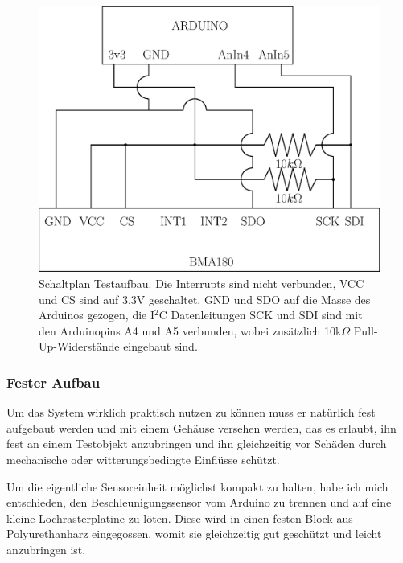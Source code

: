 \documentclass[12pt,a4paper]{scrartcl}
\begin{document}
\begin{figure}[h]
\centering
\includegraphics[scale=.8]{schematics.eps}
\caption{Schaltplan Testaufbau. Die Interrupts sind nicht verbunden, VCC und CS sind auf 3.3V geschaltet, GND und SDO auf die Masse des Arduinos gezogen, die I$^2$C Datenleitungen SCK und SDI sind mit den Arduinopins A4 und A5 verbunden, wobei zusätzlich 10k$\Omega$ Pull-Up-Widerstände eingebaut sind.}
\label{schematics}
\end{figure}


\newpage
\subsubsection{Fester Aufbau}

Um das System wirklich praktisch nutzen zu können muss er natürlich fest aufgebaut werden und mit einem Gehäuse versehen werden, das es erlaubt, ihn fest an einem Testobjekt anzubringen und ihn gleichzeitig vor Schäden durch mechanische oder witterungsbedingte Einflüsse schützt.

Um die eigentliche Sensoreinheit möglichst kompakt zu halten, habe ich mich entschieden, den Beschleunigungssensor vom Arduino zu trennen und auf eine kleine Lochrasterplatine zu löten. Diese wird in einen festen Block aus Polyurethanharz \citep{Components:2010fk} eingegossen, womit sie gleichzeitig gut geschützt und leicht anzubringen ist.
\end{document}
